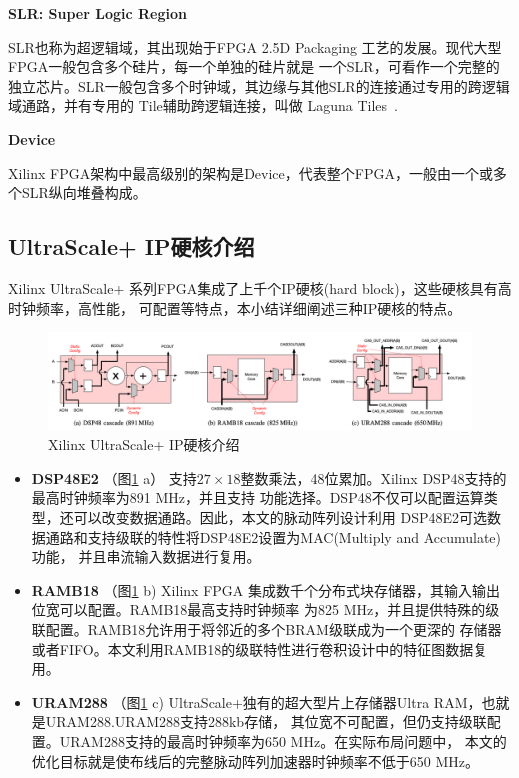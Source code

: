 {\bf SLR: Super Logic Region}

SLR也称为超逻辑域，其出现始于FPGA 2.5D Packaging 工艺的发展。现代大型FPGA一般包含多个硅片，每一个单独的硅片就是
一个SLR，可看作一个完整的独立芯片。SLR一般包含多个时钟域，其边缘与其他SLR的连接通过专用的跨逻辑域通路，并有专用的
Tile辅助跨逻辑连接，叫做 Laguna Tiles~\cite{ug903}.


{\bf Device}

Xilinx FPGA架构中最高级别的架构是Device，代表整个FPGA，一般由一个或多个SLR纵向堆叠构成。






\subsection{UltraScale+ IP硬核介绍}

Xilinx UltraScale+ 系列FPGA集成了上千个IP硬核(hard block)，这些硬核具有高时钟频率，高性能，
可配置等特点，本小结详细阐述三种IP硬核的特点。

\begin{figure}[h]
    \centering
	\includegraphics[width=\textwidth]{figure/hardblocks}
	\caption{Xilinx UltraScale+ IP硬核介绍~\cite{nachiket_stc_fpl2019}} 
	\label{fig:hardblocks}
\end{figure}

\begin{itemize}
    \item {\bf DSP48E2} （图\ref{fig:hardblocks} a）
    支持$27\times18$整数乘法，48位累加。Xilinx DSP48支持的最高时钟频率为891 MHz，并且支持
    功能选择。DSP48不仅可以配置运算类型，还可以改变数据通路。因此，本文的脉动阵列设计利用
    DSP48E2可选数据通路和支持级联的特性将DSP48E2设置为MAC(Multiply and Accumulate)功能，
    并且串流输入数据进行复用。
    
    \item {\bf RAMB18} （图\ref{fig:hardblocks} b)
    Xilinx FPGA 集成数千个分布式块存储器，其输入输出位宽可以配置。RAMB18最高支持时钟频率
    为825 MHz，并且提供特殊的级联配置。RAMB18允许用于将邻近的多个BRAM级联成为一个更深的
    存储器或者FIFO。本文利用RAMB18的级联特性进行卷积设计中的特征图数据复用。
    
    \item {\bf URAM288} （图\ref{fig:hardblocks} c)
    UltraScale+独有的超大型片上存储器Ultra RAM，也就是URAM288.URAM288支持288kb存储，
    其位宽不可配置，但仍支持级联配置。URAM288支持的最高时钟频率为650 MHz。在实际布局问题中，
    本文的优化目标就是使布线后的完整脉动阵列加速器时钟频率不低于650 MHz。

\end{itemize}

